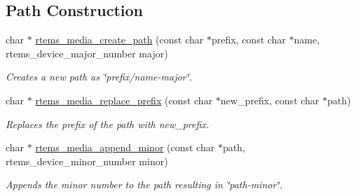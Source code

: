 \subsection*{Path Construction}
\begin{DoxyCompactItemize}
\item 
char $\ast$ \mbox{\hyperlink{group__RTEMSIOMedia_ga2c85c46ea44481e17888733b40de22f5}{rtems\+\_\+media\+\_\+create\+\_\+path}} (const char $\ast$prefix, const char $\ast$name, rtems\+\_\+device\+\_\+major\+\_\+number major)
\begin{DoxyCompactList}\small\item\em Creates a new path as \char`\"{}prefix/name-\/major\char`\"{}. \end{DoxyCompactList}\item 
char $\ast$ \mbox{\hyperlink{group__RTEMSIOMedia_ga8f3db3b675c208578fbbae1421bc7de6}{rtems\+\_\+media\+\_\+replace\+\_\+prefix}} (const char $\ast$new\+\_\+prefix, const char $\ast$path)
\begin{DoxyCompactList}\small\item\em Replaces the prefix of the {\itshape path} with {\itshape new\+\_\+prefix}. \end{DoxyCompactList}\item 
char $\ast$ \mbox{\hyperlink{group__RTEMSIOMedia_gaa27ae6204e7202e9bfcb82f606ceeb43}{rtems\+\_\+media\+\_\+append\+\_\+minor}} (const char $\ast$path, rtems\+\_\+device\+\_\+minor\+\_\+number minor)
\begin{DoxyCompactList}\small\item\em Appends the {\itshape minor} number to the {\itshape path} resulting in \char`\"{}path-\/minor\char`\"{}. \end{DoxyCompactList}\end{DoxyCompactItemize}
